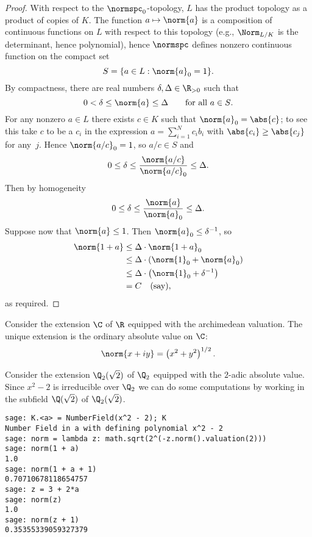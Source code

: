 \begin{proof}
With respect to the $\normspc_0$-topology, $L$ has the product topology
as a product of copies of $K$.  The
function $a\mapsto \norm{a}$ is a composition of continuous functions on $L$
with respect to this topology (e.g., $\Norm_{L/K}$ is the determinant, hence
polynomial),
hence $\normspc$ defines nonzero continuous function on the compact set 
$$
 S = \{a \in L : \norm{a}_0 = 1\}.
$$
By compactness, there are  real numbers $\delta,\Delta\in\R_{>0}$ such that 
$$
0 < \delta \leq \norm{a} \leq \Delta \qquad\text{for all $a\in S$}.
$$
For any nonzero $a\in L$ there exists $c\in K$ such that
$\norm{a}_0 = \abs{c}$; to see this take $c$ to be a $c_i$
in the expression $a=\sum_{i=1}^N c_i b_i$ with $\abs{c_i}\geq \abs{c_j}$
for any~$j$.  Hence $\norm{a/c}_0 = 1$, so $a/c\in S$ and
$$
0 \leq \delta \leq \frac{\norm{a/c}}{\norm{a/c}_0} \leq \Delta.
$$
Then by homogeneity
$$
0 \leq \delta \leq \frac{\norm{a}}{\norm{a}_0} \leq \Delta.
$$
Suppose now that $\norm{a}\leq 1$.  Then $\norm{a}_0\leq \delta^{-1}$, so 
\begin{align*}
 \norm{1+a} &\leq \Delta\cdot \norm{1+a}_0 \\
  &\leq \Delta\cdot \left( \norm{1}_0 + \norm{a}_0\right)\\
  &\leq \Delta\cdot \left( \norm{1}_0 + \delta^{-1}\right)\\
  &=C \quad\text{(say)},
\end{align*}
as required.
\end{proof}

\begin{example}
Consider the extension $\C$ of $\R$ equipped with the archimedean valuation.
The unique extension is the ordinary absolute value on $\C$:
$$\norm{x+iy} = \left(x^2 + y^2\right)^{1/2}.$$
\end{example}

\begin{example}
Consider the extension $\Q_2(\sqrt{2})$ of $\Q_2$ 
equipped with the $2$-adic absolute value.  
Since $x^2-2$ is irreducible over $\Q_2$ we can do
some computations by working in the subfield $\Q(\sqrt{2})$
of $\Q_2(\sqrt{2})$.
\begin{lstlisting}
sage: K.<a> = NumberField(x^2 - 2); K
Number Field in a with defining polynomial x^2 - 2
sage: norm = lambda z: math.sqrt(2^(-z.norm().valuation(2)))
sage: norm(1 + a)
1.0
sage: norm(1 + a + 1)
0.70710678118654757
sage: z = 3 + 2*a
sage: norm(z)
1.0
sage: norm(z + 1)
0.35355339059327379
\end{lstlisting}

\end{example}

